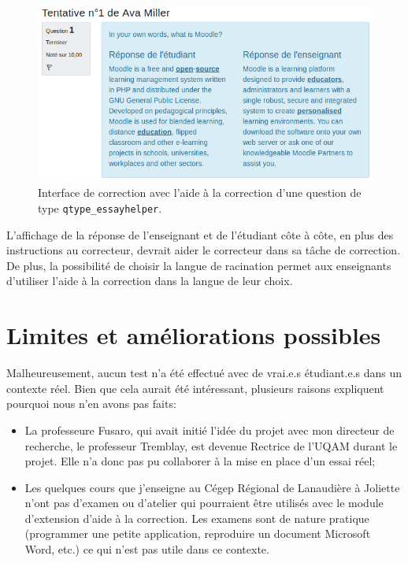 \begin{figure}[htbp]
  \includegraphics[scale=0.85]{images/questionform_correction.png}
  \caption{Interface de correction avec l'aide \`a la correction d'une question de type \texttt{qtype\_essayhelper}.}
  \label{questionform_correction}
\end{figure}

L'affichage de la r\'eponse de l'enseignant et de l'\'etudiant c\^ote \`a c\^ote, en plus des instructions au correcteur, devrait aider le correcteur dans sa t\^ache de correction.
De plus, la possibilit\'e de choisir la langue de racination permet aux enseignants d'utiliser l'aide \`a la correction dans la langue de leur choix.

\section{Limites et am\'eliorations possibles}
Malheureusement, aucun test n'a \'et\'e effectu\'e avec de vrai.e.s
\'etudiant.e.s dans un contexte r\'eel.  Bien que cela aurait \'et\'e
int\'eressant, plusieurs raisons expliquent pourquoi nous n'en avons
pas faits:
\begin{itemize}
  \item La professeure Fusaro, qui avait initi\'e l'id\'ee du projet avec mon directeur de recherche, le professeur Tremblay, est devenue Rectrice de l'UQAM durant le projet. Elle n'a donc pas pu collaborer \`a la mise en place d'un essai r\'eel;
  \item Les quelques cours que j'enseigne au C\'egep R\'egional de Lanaudi\`ere \`a Joliette n'ont pas d'examen ou d'atelier qui pourraient \^etre utilis\'es avec le module d'extension d'aide \`a la correction.
    Les examens sont de nature pratique (programmer une petite application, reproduire un document Microsoft Word, etc.) ce qui n'est pas utile dans ce contexte.
\end{itemize}

